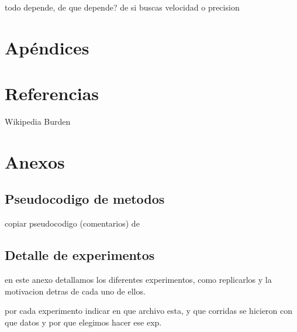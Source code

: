 \documentclass[10pt,a4paper]{article}
\begin{document}
todo depende, de que depende? de si buscas velocidad o precision



\section{Apéndices}

\section{Referencias}

Wikipedia
Burden

\section{Anexos}
\subsection{Pseudocodigo de metodos}
copiar pseudocodigo (comentarios) de %

\subsection{Detalle de experimentos}

en este anexo detallamos los diferentes experimentos, como replicarlos y la
motivacion detras de cada uno de ellos.

por cada experimento indicar en que archivo esta, y que corridas se hicieron
con que datos y por que elegimos hacer ese exp.
\end{document}
